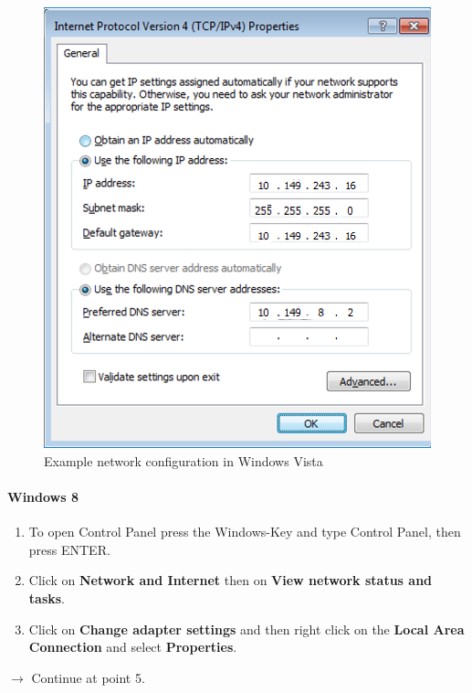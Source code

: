 \documentclass[a4paper,12pt]{scrartcl}
\newcommand{\optemph}[1]{\textbf{#1}}
\begin{document}
\begin{figure}[h!]
\begin{minipage}[c]{0.48\linewidth}
          \includegraphics[width=\linewidth,keepaspectratio]{Bilder/IP_Windows_EN}
          \caption{Example network configuration in Windows Vista}
        \end{minipage}
      \vspace{-15pt}
      \end{figure}
\paragraph*{Windows 8}
\begin{enumerate}	
	\item To open Control Panel press the Windows-Key and type Control Panel, then press ENTER.
    \item Click on \optemph{Network and Internet} then on \optemph{View network status and tasks}.
	\item Click on \optemph{Change adapter settings} and then right click on the \optemph{Local Area Connection} and select \optemph{Properties}.
\end{enumerate}
$\rightarrow$ Continue at point 5.
\end{document}
